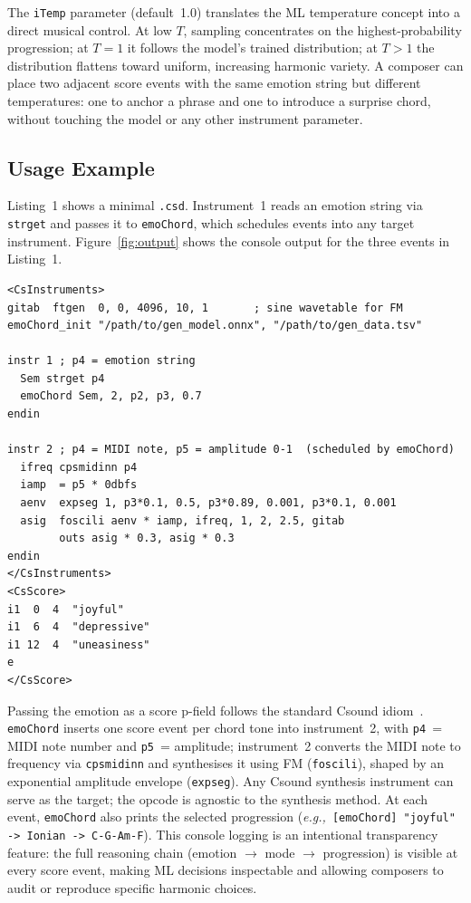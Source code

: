 \documentclass[runningheads,a4paper]{llncs}
\begin{document}
The \texttt{iTemp} parameter (default~1.0) translates the ML temperature concept
into a direct musical control. At low $T$, sampling concentrates on the highest-probability progression; at
$T = 1$ it follows the model's trained
distribution; at $T > 1$ the distribution flattens toward uniform, increasing
harmonic variety. A composer can place two adjacent score events with the same
emotion string but different temperatures: one to anchor a phrase and one to
introduce a surprise chord, without touching the model or any other instrument
parameter.

\subsection{Usage Example}

Listing~1 shows a minimal \texttt{.csd}. Instrument~1 reads an emotion string
via \texttt{strget} and passes it to \texttt{emoChord}, which schedules events
into any target instrument. Figure~\ref{fig:output} shows the console output for the three events in Listing~1.

\medskip
{}
{\small\begin{verbatim}
<CsInstruments>
gitab  ftgen  0, 0, 4096, 10, 1       ; sine wavetable for FM
emoChord_init "/path/to/gen_model.onnx", "/path/to/gen_data.tsv"

instr 1 ; p4 = emotion string
  Sem strget p4
  emoChord Sem, 2, p2, p3, 0.7
endin

instr 2 ; p4 = MIDI note, p5 = amplitude 0-1  (scheduled by emoChord)
  ifreq cpsmidinn p4
  iamp  = p5 * 0dbfs
  aenv  expseg 1, p3*0.1, 0.5, p3*0.89, 0.001, p3*0.1, 0.001
  asig  foscili aenv * iamp, ifreq, 1, 2, 2.5, gitab
        outs asig * 0.3, asig * 0.3
endin
</CsInstruments>
<CsScore>
i1  0  4  "joyful"
i1  6  4  "depressive"
i1 12  4  "uneasiness"
e
</CsScore>
\end{verbatim}}

Passing the emotion as a score p-field follows the standard Csound
idiom~\cite{boulanger2011,boulanger2000}. \texttt{emoChord} inserts one score
event per chord tone into instrument~2, with \texttt{p4}~= MIDI note number
and \texttt{p5}~= amplitude; instrument~2 converts the MIDI note to frequency
via \texttt{cpsmidinn} and synthesises it using FM (\texttt{foscili}), shaped
by an exponential amplitude envelope (\texttt{expseg}). Any Csound synthesis
instrument can serve as the target; the opcode is agnostic to the synthesis
method. At each event, \texttt{emoChord} also prints the selected progression
(\textit{e.g.,}~\texttt{[emoChord] "joyful" -> Ionian -> C-G-Am-F}). This
console logging is an intentional transparency feature: the full reasoning
chain (emotion $\to$ mode $\to$ progression) is visible at every score event,
making ML decisions inspectable and allowing composers to audit or reproduce
specific harmonic choices.
\end{document}

